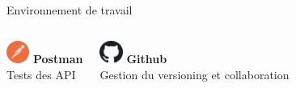 \documentclass{beamer}
\begin{document}
\begin{frame}[label=environnement]{Environnement de travail}
\begin{center}
\begin{minipage}{0.9\textwidth}
\begin{columns}[T, onlytextwidth]
        			
        				\begin{minipage}[t][2cm][t]{\linewidth}
        					\raggedright
          				\includegraphics[width=0.75cm, height=0.75cm]{../img/logo_postman.png}
          				\hspace{0.6cm} \textbf{Postman} \\
          				Tests des API
          			\end{minipage}
          			\vspace{0.7em}
          			
          			\begin{minipage}[t][2cm][t]{\linewidth}
          				\raggedright
          				\includegraphics[width=0.75cm, height=0.75cm]{../img/logo_github.png}
          				\hspace{0.6cm} \textbf{Github} \\
          				Gestion du versioning et collaboration
          			\end{minipage}

      		\end{columns}
  		\end{minipage}
	\end{center}
	\vfill
\end{frame}
\end{document}
